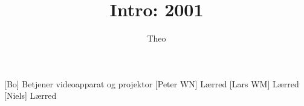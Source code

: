 \documentclass[danish]{article}
\title{Intro: 2001}
\author{Theo}
\begin{document}
\maketitle

\begin{roles}
  [Bo] Betjener videoapparat og projektor
  [Peter WN] Lærred
  [Lars WM] Lærred
  [Niels] Lærred
\end{roles}

\begin{sketch}

\end{sketch}
\end{document}
